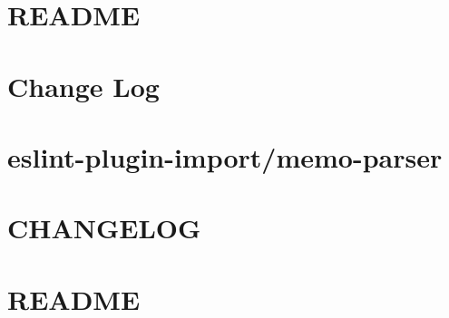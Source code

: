 \documentclass[twoside]{book}
\newcommand{\+}{\discretionary{\mbox{\scriptsize$\hookleftarrow$}}{}{}}
\begin{document}
\chapter{R\+E\+A\+D\+ME}
\label{md__c_1_workspace_demo_src_main_script_node_modules_eslint-plugin-flowtype__r_e_a_d_m_e}

\chapter{Change Log}
\label{md__c_1_workspace_demo_src_main_script_node_modules_eslint-plugin-import__c_h_a_n_g_e_l_o_g}

\chapter{eslint-\/plugin-\/import/memo-\/parser}
\label{md__c_1_workspace_demo_src_main_script_node_modules_eslint-plugin-import_memo-parser__r_e_a_d_m_e}

\chapter{C\+H\+A\+N\+G\+E\+L\+OG}
\label{md__c_1_workspace_demo_src_main_script_node_modules_eslint-plugin-import_node_modules_doctrine__c_h_a_n_g_e_l_o_g}

\chapter{R\+E\+A\+D\+ME}
\label{md__c_1_workspace_demo_src_main_script_node_modules_eslint-plugin-import_node_modules_doctrine__r_e_a_d_m_e}

\end{document}
